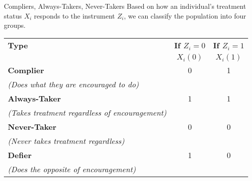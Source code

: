 \documentclass[
  ignorenonframetext,
  aspectratio=169]{beamer}
\begin{document}
\begin{frame}{Compliers, Always-Takers, Never-Takers}
\label{compliers-always-takers-never-takers}
Based on how an individual's treatment status \(X_i\) responds to the
instrument \(Z_i\), we can classify the population into four groups.

\begin{table}[h]
\centering
\begin{tabular}{lcc}
\toprule
\textbf{Type} & \textbf{If $Z_i=0$} & \textbf{If $Z_i=1$} \\
& $X_i(0)$ & $X_i(1)$ \\
\midrule
\textbf{Complier} & 0 & 1 \\
\textit{(Does what they are encouraged to do)} & & \\
\addlinespace
\textbf{Always-Taker} & 1 & 1 \\
\textit{(Takes treatment regardless of encouragement)} & & \\
\addlinespace
\textbf{Never-Taker} & 0 & 0 \\
\textit{(Never takes treatment regardless)} & & \\
\addlinespace
\textbf{Defier} & 1 & 0 \\
\textit{(Does the opposite of encouragement)} & & \\
\bottomrule
\end{tabular}
\end{table}
\end{frame}
\end{document}
